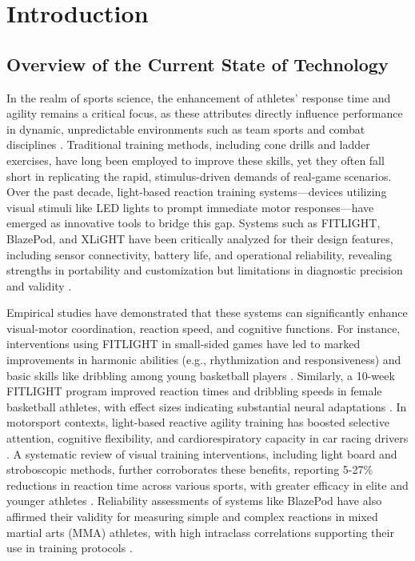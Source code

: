 \chapter{Introduction}
\label{sec:researchdesc}    %

\section{Overview of the Current State of Technology}
\label{sec:overview}

	In the realm of sports science, the enhancement of athletes' response time and agility remains a critical focus, as these attributes directly influence performance in dynamic, unpredictable environments such as team sports and combat disciplines \parencite{Hassan:2023:ESF}. Traditional training methods, including cone drills and ladder exercises, have long been employed to improve these skills, yet they often fall short in replicating the rapid, stimulus-driven demands of real-game scenarios. Over the past decade, light-based reaction training systems—devices utilizing visual stimuli like LED lights to prompt immediate motor responses—have emerged as innovative tools to bridge this gap. Systems such as FITLIGHT, BlazePod, and XLiGHT have been critically analyzed for their design features, including sensor connectivity, battery life, and operational reliability, revealing strengths in portability and customization but limitations in diagnostic precision and validity \parencite{Ezhov:2021:MLS}.
	
	Empirical studies have demonstrated that these systems can significantly enhance visual-motor coordination, reaction speed, and cognitive functions. For instance, interventions using FITLIGHT in small-sided games have led to marked improvements in harmonic abilities (e.g., rhythmization and responsiveness) and basic skills like dribbling among young basketball players \parencite{Hassan:2023:ESF}. Similarly, a 10-week FITLIGHT program improved reaction times and dribbling speeds in female basketball athletes, with effect sizes indicating substantial neural adaptations \parencite{Hassan:2025:FTI}. In motorsport contexts, light-based reactive agility training has boosted selective attention, cognitive flexibility, and cardiorespiratory capacity in car racing drivers \parencite{Horvath:2022:ARA}. A systematic review of visual training interventions, including light board and stroboscopic methods, further corroborates these benefits, reporting 5-27\% reductions in reaction time across various sports, with greater efficacy in elite and younger athletes \parencite{Jothi:2025:EVT}. Reliability assessments of systems like BlazePod have also affirmed their validity for measuring simple and complex reactions in mixed martial arts (MMA) athletes, with high intraclass correlations supporting their use in training protocols \parencite{Polechonski:2024:RVR}.
	
